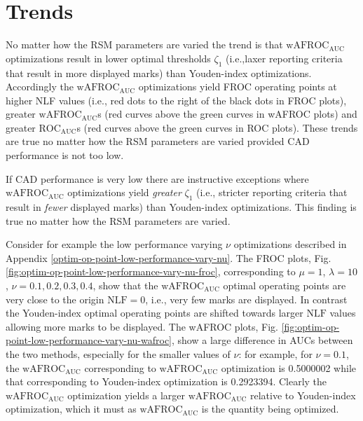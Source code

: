 \documentclass[
]{book}
\begin{document}
\hypertarget{optim-op-point-trends}{%
\section{Trends}\label{optim-op-point-trends}}

No matter how the RSM parameters are varied the trend is that \(\text{wAFROC}_\text{AUC}\) optimizations result in lower optimal thresholds \(\zeta_1\) (i.e.,laxer reporting criteria that result in more displayed marks) than Youden-index optimizations. Accordingly the \(\text{wAFROC}_\text{AUC}\) optimizations yield FROC operating points at higher NLF values (i.e., red dots to the right of the black dots in FROC plots), greater \(\text{wAFROC}_\text{AUC}\)s (red curves above the green curves in wAFROC plots) and greater \(\text{ROC}_\text{AUC}\)s (red curves above the green curves in ROC plots). These trends are true no matter how the RSM parameters are varied provided CAD performance is not too low.

If CAD performance is very low there are instructive exceptions where \(\text{wAFROC}_\text{AUC}\) optimizations yield \emph{greater} \(\zeta_1\) (i.e., stricter reporting criteria that result in \emph{fewer} displayed marks) than Youden-index optimizations. This finding is true no matter how the RSM parameters are varied.

Consider for example the low performance varying \(\nu\) optimizations described in Appendix \ref{optim-op-point-low-performance-vary-nu}. The FROC plots, Fig. \ref{fig:optim-op-point-low-performance-vary-nu-froc}, corresponding to \(\mu = 1\), \(\lambda = 10\), \(\nu = 0.1, 0.2, 0.3, 0.4\), show that the \(\text{wAFROC}_\text{AUC}\) optimal operating points are very close to the origin \(\text{NLF} = 0\), i.e., very few marks are displayed. In contrast the Youden-index optimal operating points are shifted towards larger \(\text{NLF}\) values allowing more marks to be displayed. The wAFROC plots, Fig. \ref{fig:optim-op-point-low-performance-vary-nu-wafroc}, show a large difference in AUCs between the two methods, especially for the smaller values of \(\nu\): for example, for \(\nu=0.1\), the \(\text{wAFROC}_\text{AUC}\) corresponding to \(\text{wAFROC}_\text{AUC}\) optimization is 0.5000002 while that corresponding to Youden-index optimization is 0.2923394. Clearly the \(\text{wAFROC}_\text{AUC}\) optimization yields a larger \(\text{wAFROC}_\text{AUC}\) relative to Youden-index optimization, which it must as \(\text{wAFROC}_\text{AUC}\) is the quantity being optimized.
\end{document}
